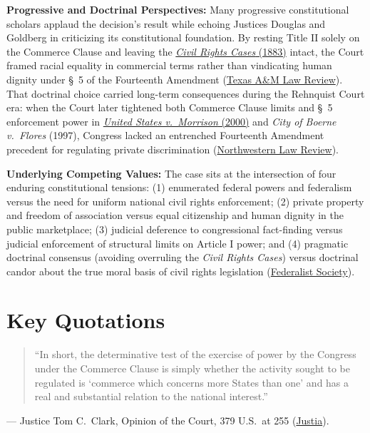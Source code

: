 \documentclass[12pt]{article}
\begin{document}
\textbf{Progressive and Doctrinal Perspectives:} Many progressive constitutional scholars applaud the decision's result while echoing Justices Douglas and Goldberg in criticizing its constitutional foundation. By resting Title II solely on the Commerce Clause and leaving the \href{https://fedsoc.org/case/the-civil-rights-cases}{\textit{Civil Rights Cases} (1883)} intact, the Court framed racial equality in commercial terms rather than vindicating human dignity under \S~5 of the Fourteenth Amendment (\href{https://scholarship.law.tamu.edu/cgi/viewcontent.cgi?article=1359&context=lawreview}{Texas A\&M Law Review}). That doctrinal choice carried long-term consequences during the Rehnquist Court era: when the Court later tightened both Commerce Clause limits and \S~5 enforcement power in \href{https://supreme.justia.com/cases/federal/us/529/598/}{\textit{United States v.\ Morrison} (2000)} and \textit{City of Boerne v.\ Flores} (1997), Congress lacked an entrenched Fourteenth Amendment precedent for regulating private discrimination (\href{https://scholarlycommons.law.northwestern.edu/cgi/viewcontent.cgi?article=1349&context=nulr}{Northwestern Law Review}).

\textbf{Underlying Competing Values:} The case sits at the intersection of four enduring constitutional tensions: (1) enumerated federal powers and federalism versus the need for uniform national civil rights enforcement; (2) private property and freedom of association versus equal citizenship and human dignity in the public marketplace; (3) judicial deference to congressional fact-finding versus judicial enforcement of structural limits on Article I power; and (4) pragmatic doctrinal consensus (avoiding overruling the \textit{Civil Rights Cases}) versus doctrinal candor about the true moral basis of civil rights legislation (\href{https://fedsoc.org/case/heart-of-atlanta-motel-inc-v-united-states}{Federalist Society}).

\section{Key Quotations}
\begin{quote}
``In short, the determinative test of the exercise of power by the Congress under the Commerce Clause is simply whether the activity sought to be regulated is `commerce which concerns more States than one' and has a real and substantial relation to the national interest.''
\end{quote}
\noindent --- Justice Tom C.\ Clark, Opinion of the Court, 379 U.S.\ at 255 (\href{https://supreme.justia.com/cases/federal/us/379/241/}{Justia}).
\end{document}
